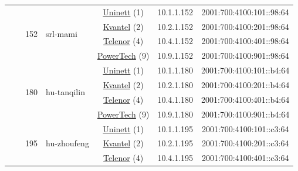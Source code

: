 \begin{small}
\begin{center}
\begin{longtable}{|c|c|c|c|c|c|c|c|}
  &  & \multirow{4}{*}{\tiny{152}} & \multicolumn{1}{|l|}{\multirow{4}{*}{\tiny{srl-mami}}} & \multicolumn{2}{|c|}{\tiny{\href{https://www.uninett.no}{Uninett} (1)}} & \tiny{10.1.1.152} & \tiny{2001:700:4100:101::98:64} \\* \cline{5-5}\cline{6-6}\cline{7-7}\cline{8-8}
  &  &  &  & \multicolumn{2}{|c|}{\tiny{\href{http://kvantel.no}{Kvantel} (2)}} & \tiny{10.2.1.152} & \tiny{2001:700:4100:201::98:64} \\* \cline{5-5}\cline{6-6}\cline{7-7}\cline{8-8}
  &  &  &  & \multicolumn{2}{|c|}{\tiny{\href{https://www.telenor.no}{Telenor} (4)}} & \tiny{10.4.1.152} & \tiny{2001:700:4100:401::98:64} \\* \cline{5-5}\cline{6-6}\cline{7-7}\cline{8-8}
  &  &  &  & \multicolumn{2}{|c|}{\tiny{\href{http://www.powertech.no}{PowerTech} (9)}} & \tiny{10.9.1.152} & \tiny{2001:700:4100:901::98:64} \\* \cline{3-3}\cline{4-4}\cline{5-5}\cline{6-6}\cline{7-7}\cline{8-8}
  &  & \multirow{4}{*}{\tiny{180}} & \multicolumn{1}{|l|}{\multirow{4}{*}{\tiny{hu-tanqilin}}} & \multicolumn{2}{|c|}{\tiny{\href{https://www.uninett.no}{Uninett} (1)}} & \tiny{10.1.1.180} & \tiny{2001:700:4100:101::b4:64} \\* \cline{5-5}\cline{6-6}\cline{7-7}\cline{8-8}
  &  &  &  & \multicolumn{2}{|c|}{\tiny{\href{http://kvantel.no}{Kvantel} (2)}} & \tiny{10.2.1.180} & \tiny{2001:700:4100:201::b4:64} \\* \cline{5-5}\cline{6-6}\cline{7-7}\cline{8-8}
  &  &  &  & \multicolumn{2}{|c|}{\tiny{\href{https://www.telenor.no}{Telenor} (4)}} & \tiny{10.4.1.180} & \tiny{2001:700:4100:401::b4:64} \\* \cline{5-5}\cline{6-6}\cline{7-7}\cline{8-8}
  &  &  &  & \multicolumn{2}{|c|}{\tiny{\href{http://www.powertech.no}{PowerTech} (9)}} & \tiny{10.9.1.180} & \tiny{2001:700:4100:901::b4:64} \\* \cline{3-3}\cline{4-4}\cline{5-5}\cline{6-6}\cline{7-7}\cline{8-8}
  &  & \multirow{4}{*}{\tiny{195}} & \multicolumn{1}{|l|}{\multirow{4}{*}{\tiny{hu-zhoufeng}}} & \multicolumn{2}{|c|}{\tiny{\href{https://www.uninett.no}{Uninett} (1)}} & \tiny{10.1.1.195} & \tiny{2001:700:4100:101::c3:64} \\* \cline{5-5}\cline{6-6}\cline{7-7}\cline{8-8}
  &  &  &  & \multicolumn{2}{|c|}{\tiny{\href{http://kvantel.no}{Kvantel} (2)}} & \tiny{10.2.1.195} & \tiny{2001:700:4100:201::c3:64} \\* \cline{5-5}\cline{6-6}\cline{7-7}\cline{8-8}
  &  &  &  & \multicolumn{2}{|c|}{\tiny{\href{https://www.telenor.no}{Telenor} (4)}} & \tiny{10.4.1.195} & \tiny{2001:700:4100:401::c3:64} \\* \cline{5-5}\cline{6-6}\cline{7-7}\cline{8-8}

\end{longtable}
\end{center}
\end{small}

